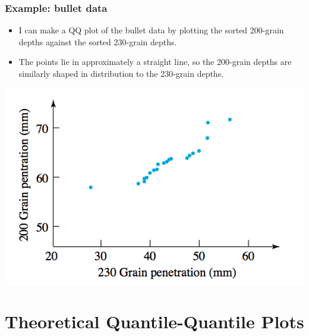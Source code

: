 \documentclass{beamer}\usepackage{graphicx, color}
\numberwithin{equation}{section}
\begin{document}
\begin{frame}
\frametitle{Example: bullet data} \small
\begin{itemize}
\item I can make a QQ plot of the bullet data by plotting the sorted 200-grain depths against the sorted 230-grain depths.
\pause \item The points lie in approximately a straight line, so the 200-grain depths are similarly shaped in distribution to the 230-grain depths.
\end{itemize}

\begin{center}
 \includegraphics{../../fig/bulletqq.png}
\end{center}
\end{frame}


\section{Theoretical Quantile-Quantile Plots}
\end{document}
